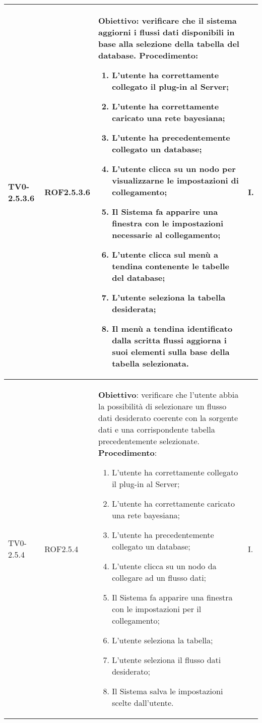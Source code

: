 \begin{longtable}{|C{.15\textwidth}|C{.13\textwidth}|m{.52\textwidth}|C{.08\textwidth}|}
TV0-2.5.3.6 & ROF2.5.3.6 &
	\textbf{Obiettivo}: verificare che il sistema aggiorni i flussi dati disponibili in base alla selezione della tabella del database. \newline
	\textbf{Procedimento}:
	\begin{enumerate}
		\item L'utente ha correttamente collegato il plug-in al Server;
		\item L'utente ha correttamente caricato una rete bayesiana;
		\item L'utente ha precedentemente collegato un database;
		\item L'utente clicca su un nodo per visualizzarne le impostazioni di collegamento;
		\item Il Sistema fa apparire una finestra con le impostazioni necessarie al collegamento;
		\item L'utente clicca sul menù a tendina contenente le tabelle del database;
		\item L'utente seleziona la tabella desiderata;
		\item Il menù a tendina identificato dalla scritta flussi aggiorna i suoi elementi sulla base della tabella selezionata.
			\end{enumerate} & I. \\
\hline

TV0-2.5.4 & ROF2.5.4 &
	\textbf{Obiettivo}: verificare che l'utente abbia la possibilità di selezionare un flusso dati desiderato coerente con la sorgente dati e  una corrispondente tabella precedentemente selezionate. \newline
	\textbf{Procedimento}:
	\begin{enumerate}
		\item L'utente ha correttamente collegato il plug-in al Server;
		\item L'utente ha correttamente caricato una rete bayesiana;
		\item L'utente ha precedentemente collegato un database;
		\item L'utente clicca su un nodo da collegare ad un flusso dati;
		\item Il Sistema fa apparire una finestra con le impostazioni per il collegamento;
		\item L'utente seleziona la tabella;
		\item L'utente seleziona il flusso dati desiderato;
		\item Il Sistema salva le impostazioni scelte dall'utente.
	\end{enumerate}
	& I. \\
\hline


\end{longtable}
